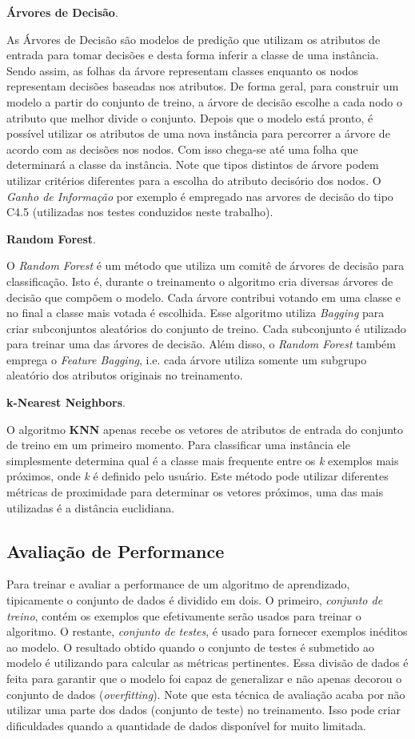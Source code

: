 \textbf{Árvores de Decisão}.

As Árvores de Decisão são modelos de predição que utilizam os atributos de entrada para tomar decisões e desta forma inferir a classe de uma instância.
Sendo assim, as folhas da árvore representam classes enquanto os nodos representam decisões baseadas nos atributos.
De forma geral, para construir um modelo a partir do conjunto de treino, a árvore de decisão escolhe a cada nodo o atributo que melhor divide o conjunto.
Depois que o modelo está pronto, é possível utilizar os atributos de uma nova instância para percorrer a árvore de acordo com as decisões nos nodos.
Com isso chega-se até uma folha que determinará a classe da instância.
Note que tipos distintos de árvore podem utilizar critérios diferentes para a escolha do atributo decisório dos nodos.
O \textit{ Ganho de Informação} por exemplo é empregado nas arvores de decisão do tipo C4.5 (utilizadas nos testes conduzidos neste trabalho).

\textbf{Random Forest}.

O \textit{Random Forest} é um método que utiliza um comitê de árvores de decisão para classificação.
Isto é, durante o treinamento o algoritmo cria diversas árvores de decisão que compõem o modelo.
Cada árvore contribui votando em uma classe e no final a classe mais votada é escolhida.
Esse algoritmo utiliza \textit{Bagging} para criar subconjuntos aleatórios do conjunto de treino.
Cada subconjunto é utilizado para treinar uma das árvores de decisão.
Além disso, o \textit{Random Forest} também emprega o \textit{Feature Bagging}, i.e. cada árvore utiliza somente um subgrupo aleatório dos atributos originais no treinamento.


\textbf{k-Nearest Neighbors}.

O algoritmo \textbf{KNN} apenas recebe os vetores de atributos de entrada do conjunto de treino em um primeiro momento.
Para classificar uma instância ele simplesmente determina qual é a classe mais frequente entre os \textit{k} exemplos mais próximos, onde \textit{k} é definido pelo usuário.
Este método pode utilizar diferentes métricas de proximidade para determinar os vetores próximos, uma das mais utilizadas é a distância euclidiana.

\subsection{Avaliação de Performance}

Para treinar e avaliar a performance de um algoritmo de aprendizado, tipicamente o conjunto de dados é dividido em dois.
O primeiro, \textit{conjunto de treino}, contém os exemplos que efetivamente serão usados para treinar o algoritmo.
O restante, \textit{conjunto de testes}, é usado para fornecer exemplos inéditos ao modelo.
O resultado obtido quando o conjunto de testes é submetido ao modelo é utilizando para calcular as métricas pertinentes.
Essa divisão de dados é feita para garantir que o modelo foi capaz de generalizar e não apenas decorou o conjunto de dados (\textit{overfitting}).
Note que esta técnica de avaliação acaba por não utilizar uma parte dos dados (conjunto de teste) no treinamento.
Isso pode criar dificuldades quando a quantidade de dados disponível for muito limitada.

